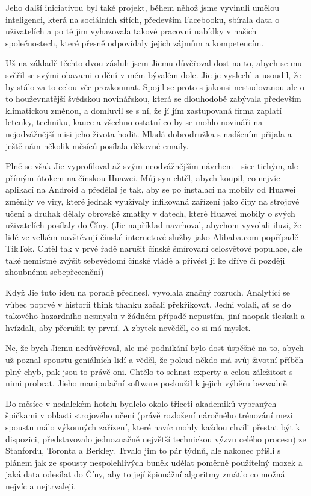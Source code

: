 Jeho další iniciativou byl také projekt, během něhož jsme vyvinuli umělou inteligenci, která na sociálních sítích, především Facebooku, sbírala data o uživatelích a po té jim vyhazovala takové pracovní nabídky v našich společnostech, které přesně odpovídaly jejich zájmům a kompetencím.

Už na základě těchto dvou zásluh jsem Jiemu důvěřoval dost na to, abych se mu svěřil se svými obavami o dění v mém bývalém dole. Jie je vyslechl a usoudil, že by stálo za to celou věc prozkoumat. Spojil se proto s jakousi nestudovanou ale o to houževnatější švédskou novinářskou, která se dlouhodobě zabývala především klimatickou změnou, a domluvil se s ní, že jí jím zastupovaná firma zaplatí letenky, techniku, kauce a všechno ostatní co by se mohlo novináři na nejodvážnější misi jeho života hodit. Mladá dobrodružka s nadšením přijala a ještě nám několik měsíců posílala děkovné emaily.

Plně se však Jie vyprofiloval až svým neodvážnějším návrhem - sice tichým, ale přímým útokem na čínskou Huawei. Můj syn chtěl, abych koupil, co nejvíc aplikací na Android a předělal je tak, aby se po instalaci na mobily od Huawei změnily ve viry, které jednak využívaly infikovaná zařízení jako čipy na strojové učení a druhak dělaly obrovské zmatky v datech, které Huawei mobily o svých uživatelích posílaly do Číny. (Jie například navrhoval, abychom vyvolali iluzi, že lidé ve velkém navštěvují čínské internetové služby jako Alibaba.com  popřípadě TikTok. Chtěl tak v prvé řadě narušit čínské šmírovaní celosvětové populace, ale také nemístně zvýšit sebevědomí čínské vládě a přivést ji ke dříve či později zhoubnému sebepřecenění)

Když Jie tuto ideu na poradě přednesl, vyvolala značný rozruch. Analytici se vůbec poprvé v historii think thanku začali překřikovat. Jedni volali, ať se do takového hazardního nesmyslu v žádném případě nepustím, jiní naopak tleskali a hvízdali, aby přerušili ty první.  A zbytek nevěděl, co si má myslet.

Ne, že bych Jiemu nedůvěřoval, ale mé podnikání bylo dost úspěšné na to, abych už poznal spoustu geniálních lidí a věděl, že pokud někdo má svůj životní příběh plný chyb, pak jsou to právě oni. Chtělo to sehnat experty a celou záležitost s nimi probrat. Jieho manipulační software posloužil k jejich výběru bezvadně.

Do měsíce v nedalekém hotelu bydlelo okolo třiceti akademiků vybraných špičkami v oblasti strojového učení (právě rozložení náročného trénování mezi spoustu málo výkonných zařízení, které navíc mohly každou chvíli přestat být k dispozici, představovalo jednoznačně největší technickou výzvu celého procesu) ze Stanfordu, Toronta a Berkley. Trvalo jim to pár týdnů, ale nakonec přišli s plánem jak ze spousty nespolehlivých buněk udělat poměrně použitelný mozek a jaká data odesílat do Číny, aby to její špionážní algoritmy zmátlo co možná nejvíc a nejtrvaleji. 

